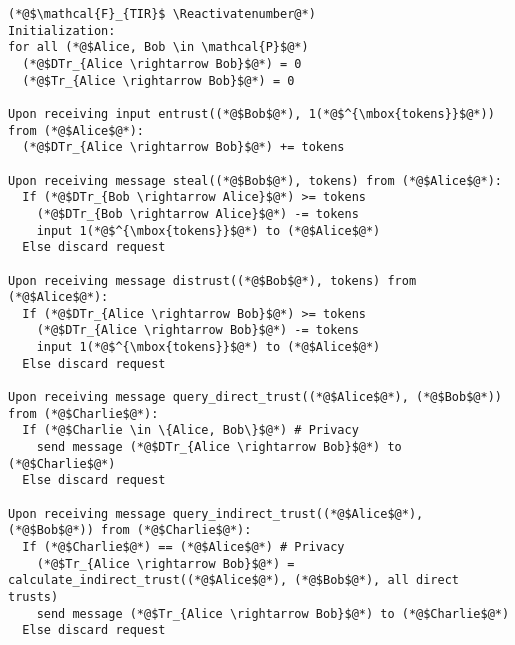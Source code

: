 \Suppressnumber
\begin{lstlisting}[label=tirfunc, style=numbers]
(*@$\mathcal{F}_{TIR}$ \Reactivatenumber@*)
Initialization:
for all (*@$Alice, Bob \in \mathcal{P}$@*)
  (*@$DTr_{Alice \rightarrow Bob}$@*) = 0
  (*@$Tr_{Alice \rightarrow Bob}$@*) = 0

Upon receiving input entrust((*@$Bob$@*), 1(*@$^{\mbox{tokens}}$@*)) from (*@$Alice$@*):
  (*@$DTr_{Alice \rightarrow Bob}$@*) += tokens

Upon receiving message steal((*@$Bob$@*), tokens) from (*@$Alice$@*):
  If (*@$DTr_{Bob \rightarrow Alice}$@*) >= tokens
    (*@$DTr_{Bob \rightarrow Alice}$@*) -= tokens
    input 1(*@$^{\mbox{tokens}}$@*) to (*@$Alice$@*)
  Else discard request

Upon receiving message distrust((*@$Bob$@*), tokens) from (*@$Alice$@*):
  If (*@$DTr_{Alice \rightarrow Bob}$@*) >= tokens
    (*@$DTr_{Alice \rightarrow Bob}$@*) -= tokens
    input 1(*@$^{\mbox{tokens}}$@*) to (*@$Alice$@*)
  Else discard request

Upon receiving message query_direct_trust((*@$Alice$@*), (*@$Bob$@*)) from (*@$Charlie$@*):
  If (*@$Charlie \in \{Alice, Bob\}$@*) # Privacy
    send message (*@$DTr_{Alice \rightarrow Bob}$@*) to (*@$Charlie$@*)
  Else discard request

Upon receiving message query_indirect_trust((*@$Alice$@*), (*@$Bob$@*)) from (*@$Charlie$@*):
  If (*@$Charlie$@*) == (*@$Alice$@*) # Privacy
    (*@$Tr_{Alice \rightarrow Bob}$@*) = calculate_indirect_trust((*@$Alice$@*), (*@$Bob$@*), all direct trusts)
    send message (*@$Tr_{Alice \rightarrow Bob}$@*) to (*@$Charlie$@*)
  Else discard request
\end{lstlisting}
